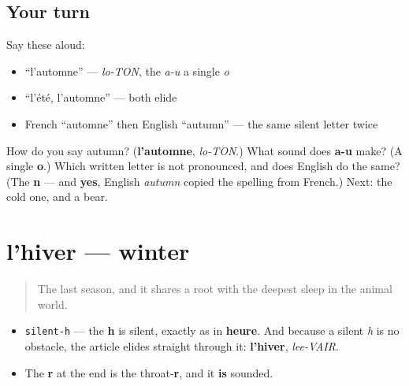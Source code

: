 \subsection*{Your turn}
Say these aloud:

\begin{itemize}
\raggedright
  \item \textquotedblleft{}l'automne\textquotedblright{} — \emph{lo-TON}, the \emph{a-u} a single \emph{o}
  \item \textquotedblleft{}l'été, l'automne\textquotedblright{} — both elide
  \item French \textquotedblleft{}automne\textquotedblright{} then English \textquotedblleft{}autumn\textquotedblright{} — the same silent letter twice
\end{itemize}

\begin{tcolorbox}[breakable,colback=teal!4,colframe=teal!35!black,title={Before you move on}]
How do you say autumn? (\textbf{l'automne}, \emph{lo-TON}.) What sound does \textbf{a-u} make? (A single \textbf{o}.) Which written letter is not pronounced, and does English do the same? (The \textbf{n} — and \textbf{yes}, English \emph{autumn} copied the spelling from French.) Next: the cold one, and a bear.
\end{tcolorbox}
\section[l'hiver]{l'hiver — winter}

\label{lesson:FR-C09-hiver}



\begin{quote}
The last season, and it shares a root with the deepest sleep in the animal world.
\end{quote}

\begin{sounds}
\begin{itemize}
\raggedright
  \item \texttt{silent-h} — the \textbf{h} is silent, exactly as in \textbf{heure}. And because a silent \emph{h} is no obstacle, the article elides straight through it: \textbf{l'hiver}, \emph{lee-VAIR}.
  \item The \textbf{r} at the end is the throat-\textbf{r}, and it \textbf{is} sounded.
\end{itemize}
\end{sounds}

